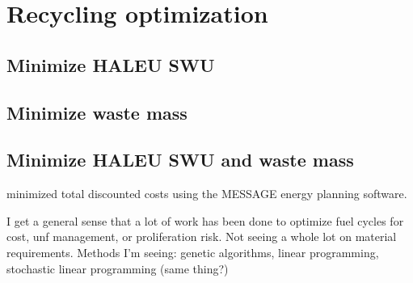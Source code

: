 \section{Recycling optimization}
\subsection{Minimize HALEU SWU}

\subsection{Minimize waste mass}

\subsection{Minimize HALEU SWU and waste mass}



\cite{andrianov_optimization_2019} minimized total discounted costs using 
the MESSAGE energy planning software. 

I get a general sense that a lot of work has been done to optimize fuel cycles 
for cost, unf management, or proliferation risk. Not seeing a whole lot on 
material requirements. 
Methods I'm seeing: genetic algorithms, linear programming, stochastic linear 
programming (same thing?)

